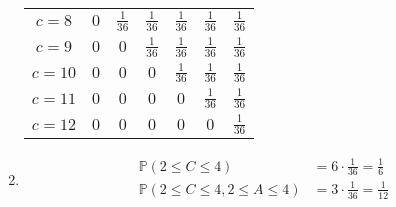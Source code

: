 \begin{enumerate}[label=\alph*.]
\begin{tabular}{c|cccccc}
$c = 8$  & $0$ & $\frac{1}{36}$ & $\frac{1}{36}$ & $\frac{1}{36}$ & $\frac{1}{36}$ & $\frac{1}{36}$ \\
$c = 9$  & $0$ & $0$ & $\frac{1}{36}$ & $\frac{1}{36}$ & $\frac{1}{36}$ & $\frac{1}{36}$ \\
$c = 10$ & $0$ & $0$ & $0$ & $\frac{1}{36}$ & $\frac{1}{36}$ & $\frac{1}{36}$ \\
$c = 11$ & $0$ & $0$ & $0$ & $0$ & $\frac{1}{36}$ & $\frac{1}{36}$ \\
$c = 12$ & $0$ & $0$ & $0$ & $0$ & $0$ & $\frac{1}{36}$ \\
\end{tabular}
\item
\begin{align*}
\mathbb{P}(2 \leq C \leq 4) &= 6 \cdot \frac{1}{36} = \frac{1}{6} \\
\mathbb{P}(2 \leq C \leq 4, 2 \leq A \leq 4) &= 3 \cdot \frac{1}{36} = \frac{1}{12} \\
\end{align*}
\end{enumerate}

\paragraph{}

